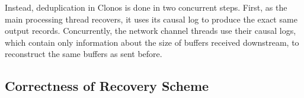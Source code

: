 \documentclass[sigconf]{acmart}
\begin{document}
Instead, deduplication in Clonos is done in two concurrent steps. First, as the main processing thread recovers, it uses its causal log to produce the exact same output records. Concurrently, the network channel threads use their causal logs, which contain only information about the size of buffers received downstream, to reconstruct the same buffers as sent before. %


\subsection{Correctness of Recovery Scheme}
\label{sec:determinant-recovery}


\end{document}
